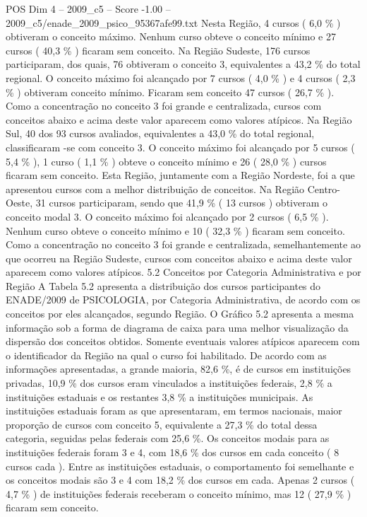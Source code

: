 \begin{textsample}{POS Dim 4 – 2009\_c5 – Score -1.00 – 2009\_c5/enade\_2009\_psico\_95367afe99.txt}
Nesta Região, 4 cursos ( 6,0 \% ) obtiveram o conceito máximo.
Nenhum curso obteve o conceito mínimo e 27 cursos ( 40,3 \% ) ficaram sem conceito.
Na Região Sudeste, 176 cursos participaram, dos quais, 76 obtiveram o conceito 3, equivalentes a 43,2 \% do total regional.
O conceito máximo foi alcançado por 7 cursos ( 4,0 \% ) e 4 cursos ( 2,3 \% ) obtiveram conceito mínimo.
Ficaram sem conceito 47 cursos ( 26,7 \% ).
Como a concentração no conceito 3 foi grande e centralizada, cursos com conceitos abaixo e acima deste valor aparecem como valores atípicos.
Na Região Sul, 40 dos 93 cursos avaliados, equivalentes a 43,0 \% do total regional, classificaram -se com conceito 3.
O conceito máximo foi alcançado por 5 cursos ( 5,4 \% ), 1 curso ( 1,1 \% ) obteve o conceito mínimo e 26 ( 28,0 \% ) cursos ficaram sem conceito.
Esta Região, juntamente com a Região Nordeste, foi a que apresentou cursos com a melhor distribuição de conceitos.
Na Região Centro-Oeste, 31 cursos participaram, sendo que 41,9 \% ( 13 cursos ) obtiveram o conceito modal 3.
O conceito máximo foi alcançado por 2 cursos ( 6,5 \% ).
Nenhum curso obteve o conceito mínimo e 10 ( 32,3 \% ) ficaram sem conceito.
Como a concentração no conceito 3 foi grande e centralizada, semelhantemente ao que ocorreu na Região Sudeste, cursos com conceitos abaixo e acima deste valor aparecem como valores atípicos. 5.2 Conceitos por Categoria Administrativa e por Região A Tabela 5.2 apresenta a distribuição dos cursos participantes do ENADE/2009 de PSICOLOGIA, por Categoria Administrativa, de acordo com os conceitos por eles alcançados, segundo Região.
O Gráfico 5.2 apresenta a mesma informação sob a forma de diagrama de caixa para uma melhor visualização da dispersão dos conceitos obtidos.
Somente eventuais valores atípicos aparecem com o identificador da Região na qual o curso foi habilitado.
De acordo com as informações apresentadas, a grande maioria, 82,6 \%, é de cursos em instituições privadas, 10,9 \% dos cursos eram vinculados a instituições federais, 2,8 \% a instituições estaduais e os restantes 3,8 \% a instituições municipais.
As instituições estaduais foram as que apresentaram, em termos nacionais, maior proporção de cursos com conceito 5, equivalente a 27,3 \% do total dessa categoria, seguidas pelas federais com 25,6 \%.
Os conceitos modais para as instituições federais foram 3 e 4, com 18,6 \% dos cursos em cada conceito ( 8 cursos cada ).
Entre as instituições estaduais, o comportamento foi semelhante e os conceitos modais são 3 e 4 com 18,2 \% dos cursos em cada.
Apenas 2 cursos ( 4,7 \% ) de instituições federais receberam o conceito mínimo, mas 12 ( 27,9 \% ) ficaram sem conceito.

\end{textsample}
